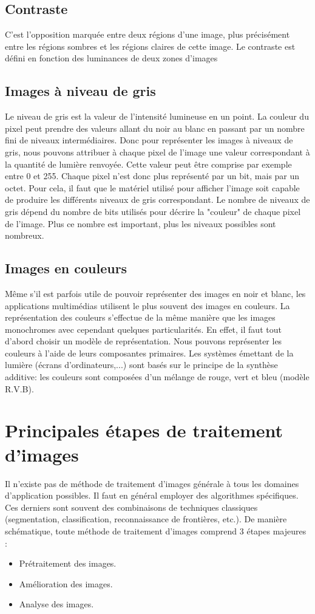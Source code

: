 \documentclass[11pt]{report}
\begin{document}
\subsection{Contraste}
C’est l’opposition marquée entre deux régions d’une image, plus précisément entre
les régions sombres et les régions claires de cette image. Le contraste est défini en fonction
des luminances de deux zones d’images
\subsection{Images à niveau de gris}
Le niveau de gris est la valeur de l’intensité lumineuse en un point. La couleur du
pixel peut prendre des valeurs allant du noir au blanc en passant par un nombre fini de
niveaux intermédiaires. Donc pour représenter les images à niveaux de gris, nous pouvons
attribuer à chaque pixel de l’image une valeur correspondant à la quantité de lumière
renvoyée. Cette valeur peut être comprise par exemple entre 0 et 255. Chaque pixel n’est
donc plus représenté par un bit, mais par un octet. Pour cela, il faut que le matériel utilisé
pour afficher l’image soit capable de produire les différents niveaux de gris correspondant.
Le nombre de niveaux de gris dépend du nombre de bits utilisés pour décrire la
"couleur" de chaque pixel de l’image. Plus ce nombre est important, plus les niveaux
possibles sont nombreux.
\subsection{Images en couleurs}
Même s’il est parfois utile de pouvoir représenter des images en noir et blanc, les
applications multimédias utilisent le plus souvent des images en couleurs. La représentation
des couleurs s’effectue de la même manière que les images monochromes avec cependant
quelques particularités. En effet, il faut tout d’abord choisir un modèle de représentation.
Nous pouvons représenter les couleurs à l’aide de leurs composantes primaires. Les
systèmes émettant de la lumière (écrans d’ordinateurs,...) sont basés sur le principe de la synthèse additive: les couleurs sont composées d’un mélange de rouge, vert et bleu (modèle
R.V.B).
\section{Principales étapes de traitement d’images}
Il n'existe pas de méthode de traitement d'images générale à tous les domaines
d'application possibles. Il faut en général employer des algorithmes spécifiques. Ces derniers
sont souvent des combinaisons de techniques classiques (segmentation, classification,
reconnaissance de frontières, etc.). De manière schématique, toute méthode de traitement
d'images comprend 3 étapes majeures :
\begin{itemize}
\item  Prétraitement des images.

\item  Amélioration des images.

\item Analyse des images.
\end{itemize}
\end{document}
